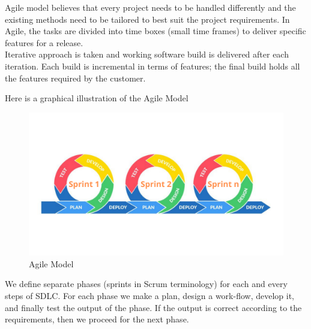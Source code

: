 Agile model believes that every project needs to be handled differently and the existing methods need to be tailored to best suit the project requirements. In Agile, the tasks are divided into time boxes (small time frames) to deliver specific features for a release.\\

Iterative approach is taken and working software build is delivered after each iteration. Each build is incremental in terms of features; the final build holds all the features required by the customer.


Here is a graphical illustration of the Agile Model 
\begin{figure}[H]
    \centering
    \includegraphics[width=1\textwidth]{images/agile}
    \caption{Agile Model}
    \label{fig:agile}
\end{figure}
We define separate phases (sprints in Scrum terminology) for each and every steps of SDLC. For each phase we make a plan, design a work-flow, develop it, and finally test the output of the phase. If the output is correct according to the requirements, then we proceed for the next phase.\\

